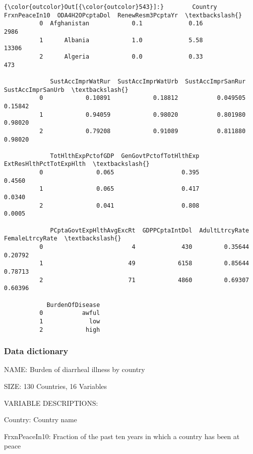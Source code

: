 \documentclass[11pt]{article}
\begin{document}
\begin{Verbatim}[commandchars=\\\{\}]
{\color{outcolor}Out[{\color{outcolor}543}]:}        Country  FrxnPeaceIn10  ODA4H2OPcptaDol  RenewResm3PcptaYr  \textbackslash{}
          0  Afghanistan            0.1             0.16               2986   
          1      Albania            1.0             5.58              13306   
          2      Algeria            0.0             0.33                473   
          
             SustAccImprWatRur  SustAccImprWatUrb  SustAccImprSanRur  SustAccImprSanUrb  \textbackslash{}
          0            0.10891            0.18812           0.049505            0.15842   
          1            0.94059            0.98020           0.801980            0.98020   
          2            0.79208            0.91089           0.811880            0.98020   
          
             TotHlthExpPctofGDP  GenGovtPctofTotHlthExp  ExtResHlthPctTotExpHlth  \textbackslash{}
          0               0.065                   0.395                   0.4560   
          1               0.065                   0.417                   0.0340   
          2               0.041                   0.808                   0.0005   
          
             PCptaGovtExpHlthAvgExcRt  GDPPCptaIntDol  AdultLtrcyRate  FemaleLtrcyRate  \textbackslash{}
          0                         4             430         0.35644          0.20792   
          1                        49            6158         0.85644          0.78713   
          2                        71            4860         0.69307          0.60396   
          
            BurdenOfDisease  
          0           awful  
          1             low  
          2            high  
\end{Verbatim}
            
    \subsubsection{Data dictionary}\label{data-dictionary}

NAME: Burden of diarrheal illness by country

SIZE: 130 Countries, 16 Variables

VARIABLE DESCRIPTIONS:

Country: Country name

FrxnPeaceIn10: Fraction of the past ten years in which a country has
been at peace
\end{document}
